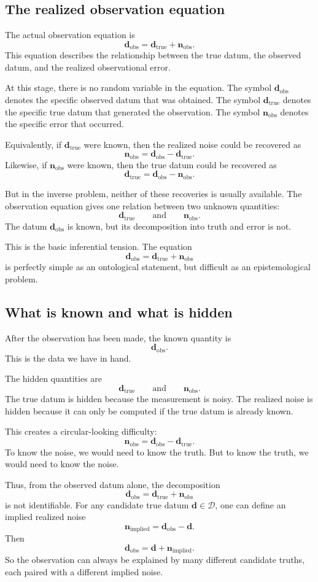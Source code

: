 \documentclass[11pt]{article}
\newcommand{\Dspace}{\mathcal D}
\newcommand{\dtrue}{\mathbf d_{\mathrm{true}}}
\newcommand{\dobs}{\mathbf d_{\mathrm{obs}}}
\newcommand{\nobs}{\mathbf n_{\mathrm{obs}}}
\begin{document}
\subsection{The realized observation equation}

The actual observation equation is
\[
    \dobs=\dtrue+\nobs.
\]
This equation describes the relationship between the true datum, the observed datum, and the realized observational error.

At this stage, there is no random variable in the equation. The symbol \(\dobs\) denotes the specific observed datum that was obtained. The symbol \(\dtrue\) denotes the specific true datum that generated the observation. The symbol \(\nobs\) denotes the specific error that occurred.

Equivalently, if \(\dtrue\) were known, then the realized noise could be recovered as
\[
    \nobs=\dobs-\dtrue.
\]
Likewise, if \(\nobs\) were known, then the true datum could be recovered as
\[
    \dtrue=\dobs-\nobs.
\]

But in the inverse problem, neither of these recoveries is usually available. The observation equation gives one relation between two unknown quantities:
\[
    \dtrue
    \qquad
    \text{and}
    \qquad
    \nobs.
\]
The datum \(\dobs\) is known, but its decomposition into truth and error is not.

This is the basic inferential tension. The equation
\[
    \dobs=\dtrue+\nobs
\]
is perfectly simple as an ontological statement, but difficult as an epistemological problem.

\subsection{What is known and what is hidden}

After the observation has been made, the known quantity is
\[
    \dobs.
\]
This is the data we have in hand.

The hidden quantities are
\[
    \dtrue
    \qquad
    \text{and}
    \qquad
    \nobs.
\]
The true datum is hidden because the measurement is noisy. The realized noise is hidden because it can only be computed if the true datum is already known.

This creates a circular-looking difficulty:
\[
    \nobs=\dobs-\dtrue.
\]
To know the noise, we would need to know the truth. But to know the truth, we would need to know the noise.

Thus, from the observed datum alone, the decomposition
\[
    \dobs
    =
    \dtrue
    +
    \nobs
\]
is not identifiable. For any candidate true datum \(\mathbf d\in\Dspace\), one can define an implied realized noise
\[
    \mathbf n_{\mathrm{implied}}
    =
    \dobs-\mathbf d.
\]
Then
\[
    \dobs
    =
    \mathbf d
    +
    \mathbf n_{\mathrm{implied}}.
\]
So the observation can always be explained by many different candidate truths, each paired with a different implied noise.
\end{document}

